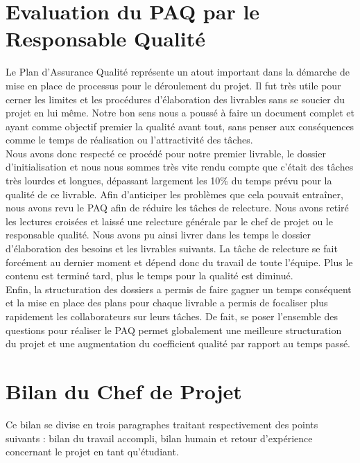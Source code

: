 \section{Evaluation du PAQ par le Responsable Qualité}

Le Plan d’Assurance Qualité représente un atout important dans la démarche de mise en place de processus pour le déroulement du projet. Il fut très utile pour cerner les limites et les procédures d’élaboration des livrables sans se soucier du projet en lui même. Notre bon sens nous a poussé à faire un document complet et ayant comme objectif premier la qualité avant tout, sans penser aux conséquences comme le temps de réalisation ou l’attractivité des tâches. \\

Nous avons donc respecté ce procédé pour notre premier livrable, le dossier d’initialisation et nous nous sommes très vite rendu compte que c’était des tâches très lourdes et longues, dépassant largement les 10\% du temps prévu pour la qualité de ce livrable. Afin d'anticiper les problèmes que cela pouvait entraîner, nous avons revu le PAQ afin de réduire les tâches de relecture. Nous avons retiré les lectures croisées et laissé une relecture générale par le chef de projet ou le responsable qualité. Nous avons pu ainsi livrer dans les temps le dossier d’élaboration des besoins et les livrables suivants. La tâche de relecture se fait forcément au dernier moment et dépend donc du travail de toute l’équipe. Plus le contenu est terminé tard, plus le temps pour la qualité est diminué. \\

Enfin, la structuration des dossiers a permis de faire gagner un temps conséquent et la mise en place des plans pour chaque livrable a permis de focaliser plus rapidement les collaborateurs sur leurs tâches. De fait, se poser l’ensemble des questions pour réaliser le PAQ permet globalement une meilleure structuration du projet et une augmentation du coefficient qualité par rapport au temps passé.

\section{Bilan du Chef de Projet}

Ce bilan se divise en trois paragraphes traitant respectivement des points suivants : bilan du travail accompli, bilan humain et retour d’expérience concernant le projet en tant qu’étudiant. \\

